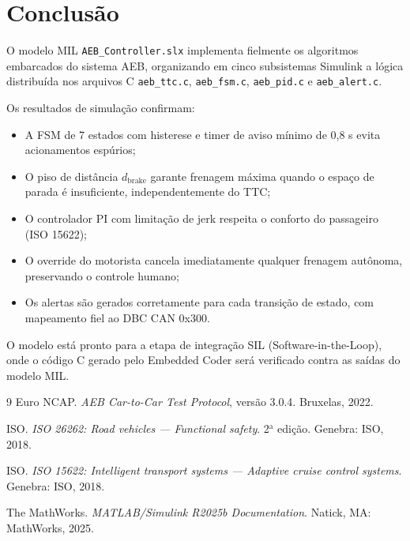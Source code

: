\documentclass[12pt,a4paper]{article}
\begin{document}
\section{Conclusão}
\label{sec:conclusao}

O modelo MIL \texttt{AEB\_Controller.slx} implementa fielmente os algoritmos
embarcados do sistema AEB, organizando em cinco subsistemas Simulink a lógica
distribuída nos arquivos C \texttt{aeb\_ttc.c}, \texttt{aeb\_fsm.c},
\texttt{aeb\_pid.c} e \texttt{aeb\_alert.c}.

Os resultados de simulação confirmam:
\begin{itemize}[noitemsep]
    \item A FSM de 7 estados com histerese e timer de aviso mínimo de 0{,}8 s
          evita acionamentos espúrios;
    \item O piso de distância $d_{\text{brake}}$ garante frenagem máxima quando
          o espaço de parada é insuficiente, independentemente do TTC;
    \item O controlador PI com limitação de jerk respeita o conforto do
          passageiro (ISO 15622);
    \item O override do motorista cancela imediatamente qualquer frenagem
          autônoma, preservando o controle humano;
    \item Os alertas são gerados corretamente para cada transição de estado,
          com mapeamento fiel ao DBC CAN 0x300.
\end{itemize}

O modelo está pronto para a etapa de integração SIL (Software-in-the-Loop),
onde o código C gerado pelo Embedded Coder será verificado contra as saídas
do modelo MIL.

\begin{thebibliography}{9}
    Euro NCAP. \textit{AEB Car-to-Car Test Protocol}, versão 3.0.4.
    Bruxelas, 2022.

    ISO. \textit{ISO 26262: Road vehicles --- Functional safety}.
    2$^{\text{a}}$ edição. Genebra: ISO, 2018.

    ISO. \textit{ISO 15622: Intelligent transport systems --- Adaptive cruise
    control systems}. Genebra: ISO, 2018.

    The MathWorks. \textit{MATLAB/Simulink R2025b Documentation}.
    Natick, MA: MathWorks, 2025.
\end{thebibliography}
\end{document}
